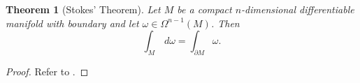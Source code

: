 \documentclass[12pt,a4paper]{article}
\numberwithin{equation}{section}
\newtheorem{theorem}{Theorem}[section]
\theoremstyle{definition}
\theoremstyle{remark}
\begin{document}
\begin{theorem}[Stokes' Theorem]
Let $M$ be a compact $n$-dimensional differentiable manifold with boundary and let $\omega\in\Omega^{n-1}(M)$. Then
\[
\int_M\,d\omega=\int_{\partial M}\omega.
\]
\label{thm:stokes}
\end{theorem}
\begin{proof}
Refer to \cite{andrews}.
\end{proof}
\end{document}
